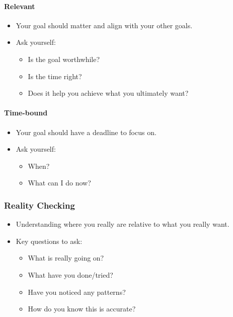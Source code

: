 \documentclass[
]{book}
\providecommand{\tightlist}{%
  \setlength{\itemsep}{0pt}\setlength{\parskip}{0pt}}
\begin{document}
\hypertarget{relevant}{%
\paragraph*{Relevant}\label{relevant}}

\begin{itemize}
\tightlist
\item
  Your goal should matter and align with your other
  goals.
\item
  Ask yourself:

  \begin{itemize}
  \tightlist
  \item
    Is the goal worthwhile?
  \item
    Is the time right?
  \item
    Does it help you achieve what you ultimately want?
  \end{itemize}
\end{itemize}

\hypertarget{time-bound}{%
\paragraph*{Time-bound}\label{time-bound}}

\begin{itemize}
\tightlist
\item
  Your goal should have a deadline to focus on.
\item
  Ask yourself:

  \begin{itemize}
  \tightlist
  \item
    When?
  \item
    What can I do now?
  \end{itemize}
\end{itemize}

\hypertarget{reality-checking}{%
\subsubsection*{Reality Checking}\label{reality-checking}}

\begin{itemize}
\tightlist
\item
  Understanding where you really are relative to what
  you really want.
\item
  Key questions to ask:

  \begin{itemize}
  \tightlist
  \item
    What is really going on?
  \item
    What have you done/tried?
  \item
    Have you noticed any patterns?
  \item
    How do you know this is accurate?
  \end{itemize}
\end{itemize}
\end{document}
